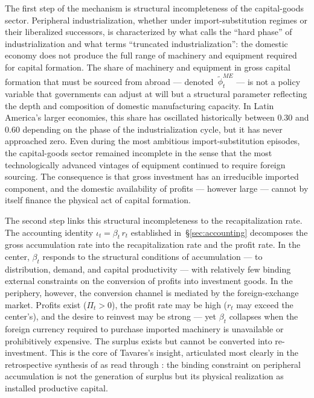 \documentclass[12pt,letterpaper]{article}
\newcommand{\iotat}{\iota_t}       %
\newcommand{\betat}{\beta_t}       %
\begin{document}
The first step of the mechanism is structural incompleteness of the
capital-goods sector. Peripheral industrialization, whether under
import-substitution regimes or their liberalized successors, is characterized
by what \citet{tavares1985} calls the ``hard phase'' of industrialization and
what \citet{fajnzylber1983} terms ``truncated industrialization'': the domestic
economy does not produce the full range of machinery and equipment required for
capital formation. The share of machinery and equipment in gross capital
formation that must be sourced from abroad ---
denoted~$\tilde{\phi}^{ME}_t$ --- is not a policy variable that governments
can adjust at will but a structural parameter reflecting the depth and
composition of domestic manufacturing capacity. In Latin America's larger
economies, this share has oscillated historically between 0.30 and 0.60
depending on the phase of the industrialization cycle, but it has never
approached zero. Even during the most ambitious import-substitution episodes,
the capital-goods sector remained incomplete in the sense that the most
technologically advanced vintages of equipment continued to require foreign
sourcing. The consequence is that gross investment has an irreducible imported
component, and the domestic availability of profits --- however large --- cannot
by itself finance the physical act of capital formation.

The second step links this structural incompleteness to the recapitalization
rate. The accounting identity $\iotat = \betat\, r_t$ established
in~\S\ref{sec:accounting} decomposes the gross accumulation rate into the
recapitalization rate and the profit rate. In the center, $\betat$ responds to
the structural conditions of accumulation --- to distribution, demand, and
capital productivity --- with relatively few binding external constraints on the
conversion of profits into investment goods. In the periphery, however, the
conversion channel is mediated by the foreign-exchange market. Profits exist
($\Pi_t > 0$), the profit rate may be high ($r_t$ may exceed the center's),
and the desire to reinvest may be strong --- yet $\betat$ collapses when the
foreign currency required to purchase imported machinery is unavailable or
prohibitively expensive. The surplus exists but cannot be converted into
re-investment. This is the core of Tavares's insight, articulated most clearly
in the retrospective synthesis of \citet{tavares2000} as read through
\citet{vernengo2006}: the binding constraint on peripheral accumulation is not
the generation of surplus but its physical realization as installed productive
capital.
\end{document}
